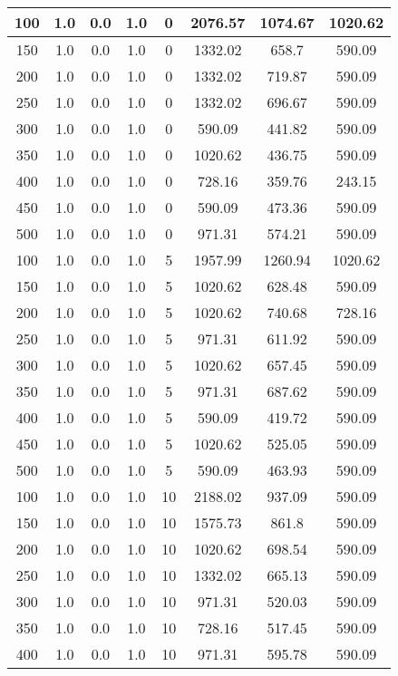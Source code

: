 \documentclass[a4paper, 12pt]{extreport}
\begin{document}
\begin{itemize}
\begin{longtable}{|c|c|c|c|c|c|c|c|}
			100 & 1.0 & 0.0 & 1.0 & 0 & 2076.57 & 1074.67 & 1020.62 \\\hline
			150 & 1.0 & 0.0 & 1.0 & 0 & 1332.02 & 658.7 & 590.09 \\\hline
			200 & 1.0 & 0.0 & 1.0 & 0 & 1332.02 & 719.87 & 590.09 \\\hline
			250 & 1.0 & 0.0 & 1.0 & 0 & 1332.02 & 696.67 & 590.09 \\\hline
			300 & 1.0 & 0.0 & 1.0 & 0 & 590.09 & 441.82 & 590.09 \\\hline
			350 & 1.0 & 0.0 & 1.0 & 0 & 1020.62 & 436.75 & 590.09 \\\hline
			400 & 1.0 & 0.0 & 1.0 & 0 & 728.16 & 359.76 & 243.15 \\\hline
			450 & 1.0 & 0.0 & 1.0 & 0 & 590.09 & 473.36 & 590.09 \\\hline
			500 & 1.0 & 0.0 & 1.0 & 0 & 971.31 & 574.21 & 590.09 \\\hline
			100 & 1.0 & 0.0 & 1.0 & 5 & 1957.99 & 1260.94 & 1020.62 \\\hline
			150 & 1.0 & 0.0 & 1.0 & 5 & 1020.62 & 628.48 & 590.09 \\\hline
			200 & 1.0 & 0.0 & 1.0 & 5 & 1020.62 & 740.68 & 728.16 \\\hline
			250 & 1.0 & 0.0 & 1.0 & 5 & 971.31 & 611.92 & 590.09 \\\hline
			300 & 1.0 & 0.0 & 1.0 & 5 & 1020.62 & 657.45 & 590.09 \\\hline
			350 & 1.0 & 0.0 & 1.0 & 5 & 971.31 & 687.62 & 590.09 \\\hline
			400 & 1.0 & 0.0 & 1.0 & 5 & 590.09 & 419.72 & 590.09 \\\hline
			450 & 1.0 & 0.0 & 1.0 & 5 & 1020.62 & 525.05 & 590.09 \\\hline
			500 & 1.0 & 0.0 & 1.0 & 5 & 590.09 & 463.93 & 590.09 \\\hline
			100 & 1.0 & 0.0 & 1.0 & 10 & 2188.02 & 937.09 & 590.09 \\\hline
			150 & 1.0 & 0.0 & 1.0 & 10 & 1575.73 & 861.8 & 590.09 \\\hline
			200 & 1.0 & 0.0 & 1.0 & 10 & 1020.62 & 698.54 & 590.09 \\\hline
			250 & 1.0 & 0.0 & 1.0 & 10 & 1332.02 & 665.13 & 590.09 \\\hline
			300 & 1.0 & 0.0 & 1.0 & 10 & 971.31 & 520.03 & 590.09 \\\hline
			350 & 1.0 & 0.0 & 1.0 & 10 & 728.16 & 517.45 & 590.09 \\\hline
			400 & 1.0 & 0.0 & 1.0 & 10 & 971.31 & 595.78 & 590.09 \\\hline

\end{longtable}
\end{itemize}
\end{document}
